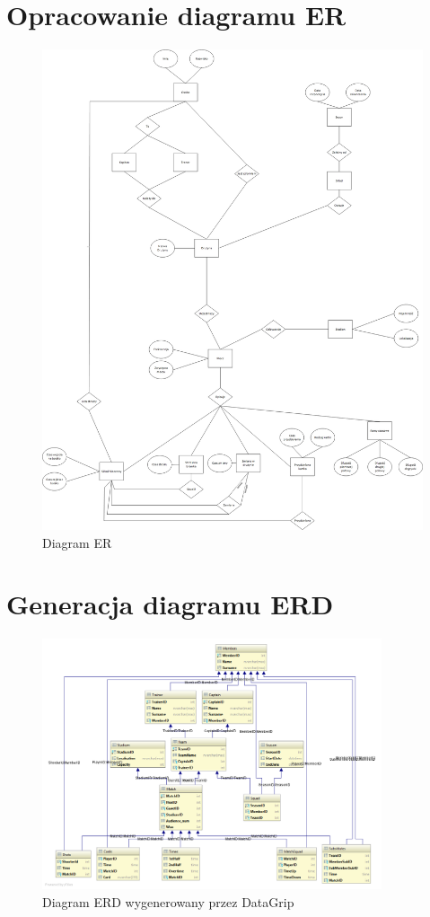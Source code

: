 \documentclass{article}
\begin{document}
\section{Opracowanie diagramu ER}
\begin{figure}[!h]
    \centering
    \includegraphics[width=\textwidth,keepaspectratio]{ER.jpg}
    \caption{Diagram ER}
    \label{ER}
\end{figure}
\newpage
\section{Generacja diagramu ERD}
\begin{figure}[!h]
    \centering
    \includegraphics[width=10cm,keepaspectratio]{dbo_DG.png}
    \caption{Diagram ERD wygenerowany przez DataGrip}
    \label{ERD_Datagrip}
\end{figure}
\end{document}
